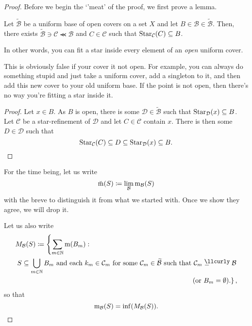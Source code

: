 \begin{thm}
\begin{savenotes}
\begin{proof}
Before we begin the `'meat' of the proof, we first prove a lemma.
\begin{lma}\label{lma5.1.5}
Let $\widetilde{\mathcal{B}}$ be a uniform base of open covers on a set $X$ and let $B\in \mathcal{B}\in \widetilde{\mathcal{B}}$.  Then, there exists $\widetilde{\mathcal{B}}\ni \mathcal{C}\llcurly \mathcal{B}$ and $C\in \mathcal{C}$ such that $\operatorname{Star} _{\mathcal{C}}(C)\subseteq B$.
\begin{rmk}
In other words, you can fit a star inside every element of an \emph{open} uniform cover.
\end{rmk}
\begin{rmk}
This is obviously false if your cover it not open.  For example, you can always do something stupid and just take a uniform cover, add a singleton to it, and then add this new cover to your old uniform base.  If the point is not open, then there's no way you're fitting a star inside it.
\end{rmk}
\begin{proof}
Let $x\in B$.  As $B$ is open, there is some $\mathcal{D}\in \widetilde{\mathcal{B}}$ such that $\operatorname{Star} _{\mathcal{D}}(x)\subseteq B$.  Let $\mathcal{C}$ be a star-refinement of $\mathcal{D}$ and let $C\in \mathcal{C}$ contain $x$.  There is then some $D\in \mathcal{D}$ such that
\begin{equation}
\operatorname{Star} _{\mathcal{C}}(C)\subseteq D\subseteq \operatorname{Star} _{\mathcal{D}}(x)\subseteq B.
\end{equation}
\end{proof}
\end{lma}

For the time being, let us write
\begin{equation}
\breve{\mathrm{m}}(S)\coloneqq \lim _{\mathcal{B}}\mathrm{m} _{\mathcal{B}}(S)
\end{equation}
with the breve to distinguish it from what we started with.  Once we show they agree, we will drop it.

Let us also write
\begin{equation}
\begin{multlined}
M_{\mathcal{B}}(S) \coloneqq \left\{ \sum _{m\in \N}\meas (B_m):\right. \\
\left. S\subseteq \bigcup _{m\in \N}B_m\text{ and  each }k_m\in \mathcal{C}_m\text{ for some }\mathcal{C}_m\in \widetilde{\mathcal{B}}\text{ such that }\mathcal{C}_m\llcurlyeq \mathcal{B}\right. \\
\left. \text{(or }B_m=\emptyset \text{).}\right\} ,
\end{multlined}
\end{equation}
so that
\begin{equation}
\mathrm{m} _{\mathcal{B}}(S)=\inf (M_{\mathcal{B}}(S)).
\end{equation}


\end{proof}
\end{savenotes}
\end{thm}
